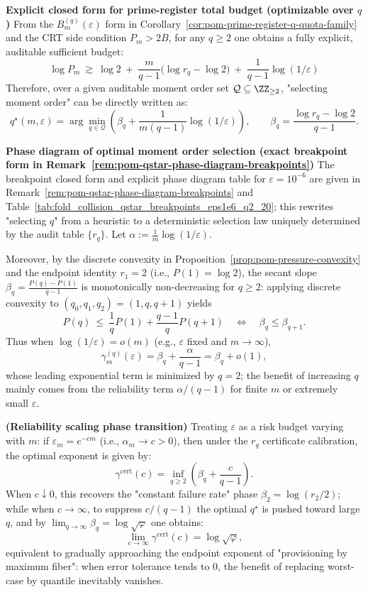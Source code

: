 \begin{remark}
\medskip\noindent\textbf{Explicit closed form for prime-register total budget (optimizable over $q$)}
From the $B_m^{(q)}(\varepsilon)$ form in Corollary~\ref{cor:pom-prime-register-q-quota-family} and the CRT side condition $P_m>2B$, for any $q\ge 2$ one obtains a fully explicit, auditable sufficient budget:
\[
\boxed{\;
\log P_m\ \gtrsim\ \log 2\ +\ \frac{m}{q-1}\bigl(\log r_q-\log 2\bigr)\ +\ \frac{1}{q-1}\log(1/\varepsilon)\;}
\]
Therefore, over a given auditable moment order set $\mathcal{Q}\subseteq\ZZ_{\ge 2}$, "selecting moment order" can be directly written as:
\[
q^\star(m,\varepsilon)=\arg\min_{q\in\mathcal{Q}}\left(\beta_q+\frac{1}{m(q-1)}\log(1/\varepsilon)\right),
\qquad
\beta_q=\frac{\log r_q-\log 2}{q-1}.
\]

\medskip\noindent\textbf{Phase diagram of optimal moment order selection (exact breakpoint form in Remark~\ref{rem:pom-qstar-phase-diagram-breakpoints})}
The breakpoint closed form and explicit phase diagram table for $\varepsilon=10^{-6}$ are given in Remark~\ref{rem:pom-qstar-phase-diagram-breakpoints} and Table~\ref{tab:fold_collision_qstar_breakpoints_eps1e6_q2_20}; this rewrites "selecting $q$" from a heuristic to a deterministic selection law uniquely determined by the audit table $\{r_q\}$.
Let $\alpha:=\frac{1}{m}\log(1/\varepsilon)$.

Moreover, by the discrete convexity in Proposition~\ref{prop:pom-pressure-convexity} and the endpoint identity $r_1=2$ (i.e., $P(1)=\log 2$), the secant slope
\(
\beta_q=\frac{P(q)-P(1)}{q-1}
\)
is monotonically non-decreasing for $q\ge 2$: applying discrete convexity to $(q_0,q_1,q_2)=(1,q,q+1)$ yields
\[
P(q)\ \le\ \frac{1}{q}P(1)+\frac{q-1}{q}P(q+1)
\quad\Longleftrightarrow\quad
\beta_q\le \beta_{q+1}.
\]
Thus when $\log(1/\varepsilon)=o(m)$ (e.g., $\varepsilon$ fixed and $m\to\infty$),
\[
\gamma_m^{(q)}(\varepsilon)=\beta_q+\frac{\alpha}{q-1}=\beta_q+o(1),
\]
whose leading exponential term is minimized by $q=2$; the benefit of increasing $q$ mainly comes from the reliability term $\alpha/(q-1)$ for finite $m$ or extremely small $\varepsilon$.

\medskip\noindent\textbf{(Reliability scaling phase transition)}
Treating $\varepsilon$ as a risk budget varying with $m$: if $\varepsilon_m=e^{-c m}$ (i.e., $\alpha_m\to c>0$), then under the $r_q$ certificate calibration, the optimal exponent is given by:
\[
\gamma^{\mathrm{cert}}(c)
=\inf_{q\ge 2}\left(\beta_q+\frac{c}{q-1}\right).
\]
When $c\downarrow 0$, this recovers the "constant failure rate" phase $\beta_2=\log(r_2/2)$;
while when $c\to\infty$, to suppress $c/(q-1)$ the optimal $q^\star$ is pushed toward large $q$, and by $\lim_{q\to\infty}\beta_q=\log\sqrt{\varphi}$ one obtains:
\[
\lim_{c\to\infty}\gamma^{\mathrm{cert}}(c)=\log\sqrt{\varphi},
\]
equivalent to gradually approaching the endpoint exponent of "provisioning by maximum fiber": when error tolerance tends to 0, the benefit of replacing worst-case by quantile inevitably vanishes.


\end{remark}
